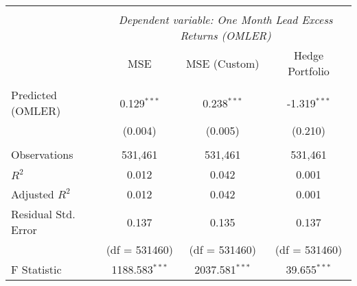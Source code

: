 \begin{table}[H] \centering
  \begin{tabular}{@{\extracolsep{5pt}}lccc}
    \\[-1.8ex]\hline
    \hline                                                                                                                                                        \\[-1.8ex]
                        & \multicolumn{3}{c}{\textit{Dependent variable: One Month Lead Excess Returns (OMLER)}} \
    \cr \cline{2-4}
    \\[-1.8ex] &  MSE & MSE (Custom) & Hedge Portfolio \\
    \hline                                                                                                                                                        \\[-1.8ex]
    Predicted (OMLER)   & 0.129$^{***}$                                                                             & 0.238$^{***}$        & -1.319$^{***}$       \\
                        & (0.004)                                                                                   & (0.005)              & (0.210)              \\
    \hline                                                                                                                                                        \\[-1.8ex]
    Observations        & 531,461                                                                                   & 531,461              & 531,461              \\
    $R^2$               & 0.012                                                                                     & 0.042                & 0.001                \\
    Adjusted $R^2$      & 0.012                                                                                     & 0.042                & 0.001                \\
    Residual Std. Error & 0.137                                                                                     & 0.135                & 0.137                \\
                        & (df = 531460)                                                                             & (df = 531460)        & (df = 531460)        \\
    F Statistic         & 1188.583$^{***}$                                                                          & 2037.581$^{***}$     & 39.655$^{***}$       \\

\end{tabular}
\end{table}
